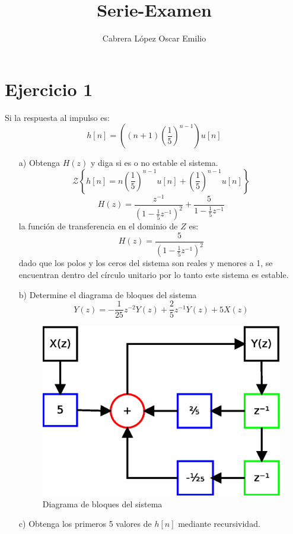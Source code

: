 \documentclass[a4paper,12pt]{article}
\title{Serie-Examen}
\author{
  Cabrera López Oscar Emilio
}
\begin{document}
\thispagestyle{fancy}
\maketitle
\newpage
\tableofcontents
\newpage

\section{Ejercicio 1}
Si la respuesta al impulso es:
\[ h[n] =\left((n +1) \left(\frac{1}{5}\right)^{n-1}\right)u[n] \]
\begin{itemize}
    \item[a)] Obtenga $H(z)$ y diga si es o no estable el sistema.
            \[ \mathcal{Z}\left\{h[n] = n\left(\frac{1}{5}\right)^{n-1}u[n] + \left(\frac{1}{5}\right)^{n-1}u[n]\right\} \]
            \[ H(z) = \frac{z^{-1}}{(1-\frac{1}{5}z^{-1})^2} + \frac{5}{1-\frac{1}{5}z^{-1}} \]
        la función de transferencia en el dominio de $Z$ es:
            \[ H(z) = \frac{5}{(1-\frac{1}{5}z^{-1})^2} \]
        dado que los polos y los ceros del sistema son reales y menores a 1, se encuentran dentro del círculo unitario por lo tanto este sistema es estable.
    \item[b)] Determine el diagrama de bloques del sistema
        \[ Y(z) = -\frac{1}{25}z^{-2}Y(z) + \frac{2}{5}z^{-1}Y(z) + 5X(z) \]
        \begin{figure}[H]
            \begin{center}
                \includegraphics[width=0.8\linewidth]{Diagrama}
                \caption{Diagrama de bloques del sistema}
                \label{fig:dia1}
            \end{center}
        \end{figure}
    \item[c)] Obtenga los primeros 5 valores de $h[n]$ mediante recursividad.

\end{itemize}
\end{document}
